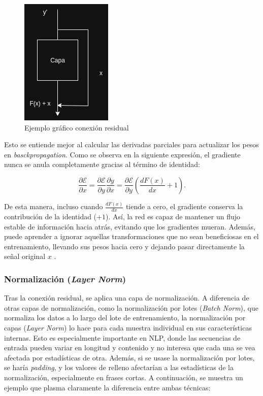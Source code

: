 \documentclass[11pt]{book}
\begin{document}
\begin{figure}[h]
    \centering
    \includegraphics[width=0.5\linewidth]{img/ResNet.png}
    \caption{Ejemplo gráfico conexión residual}
    \label{fig:placeholder13}
\end{figure}

Esto se entiende mejor al calcular las derivadas parciales para actualizar los pesos en \textit{basckpropagation}. Como se observa en la siguiente expresión, el gradiente nunca se anula completamente gracias al término de identidad: 

\[
\frac{\partial \mathcal{E}}{\partial x}
= \frac{\partial \mathcal{E}}{\partial y}
    \frac{\partial y}{\partial x}
= \frac{\partial \mathcal{E}}{\partial y}
    \left( \frac{dF(x)}{dx} + 1 \right).
\]

De esta manera, incluso cuando $\frac{dF(x)}{dx}$ tiende a cero, el gradiente conserva la contribución de la identidad ($+1$). Así, la red es capaz de mantener un flujo estable de información hacia atrás, evitando que los gradientes mueran. Además, puede aprender a ignorar aquellas transformaciones que no sean beneficiosas en el entrenamiento, llevando sus pesos hacia cero y dejando pasar directamente la señal original $x$ \parencite{apxml_addnorm}. 

\subsubsection{Normalización (\textit{Layer Norm})}

Tras la conexión residual, se aplica una capa de normalización. A diferencia de otras capas de normalización, como la normalización por lotes (\textit{Batch Norm}), que normaliza los datos a lo largo del lote de entrenamiento, la normalización por capas (\textit{Layer Norm}) lo hace para cada muestra individual en sus características internas. Esto es especialmente importante en NLP, donde las secuencias de entrada pueden variar en longitud y contenido y no interesa que cada una se vea afectada por estadísticas de otra. Además, si se usase la normalización por lotes, se haría \textit{padding}, y los valores de relleno afectarían a las estadísticas de la normalización, especialmente en frases cortas. A continuación, se muestra un ejemplo que plasma claramente la diferencia entre ambas técnicas:
\end{document}
